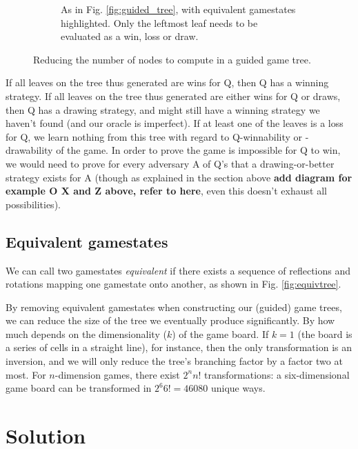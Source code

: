 \documentclass[12pt,a4paper]{article}
\begin{document}
\begin{figure}
\begin{subfigure}{.45\textwidth}
	\caption{As in Fig. \ref{fig:guided_tree}, with equivalent gamestates highlighted. Only the leftmost leaf needs to be evaluated as a win, loss or draw.} \label{fig:isotree}
\end{subfigure}
\caption{Reducing the number of nodes to compute in a guided game tree.}
\label{fig:guided_trees}
\end{figure}

If all leaves on the tree thus generated are wins for Q, then Q has a winning strategy. If all leaves on the tree thus generated are either wins for Q or draws, then Q has a drawing strategy, and might still have a winning strategy we haven't found (and our oracle is imperfect). If at least one of the leaves is a loss for Q, we learn nothing from this tree with regard to Q-winnability or -drawability of the game. 
In order to prove the game is impossible for Q to win, we would need to prove for every adversary A of Q's that a drawing-or-better strategy exists for A (though as explained in the section above \textbf{add diagram for example O X and Z above, refer to here}, even this doesn't exhaust all possibilities). 

\subsection*{Equivalent gamestates}

We can call two gamestates \textit{equivalent} if there exists a sequence of reflections and rotations mapping one gamestate onto another, as shown in Fig. \ref{fig:equivtree}. 


By removing equivalent gamestates when constructing our (guided) game trees, we can reduce the size of the tree we eventually produce significantly. By how much depends on the dimensionality ($k$) of the game board. If $k=1$ (the board is a series of cells in a straight line), for instance, then the only transformation is an inversion, and we will only reduce the tree's branching factor by a factor two at most. For $n$-dimension games, there exist $2^nn!$ transformations: a six-dimensional game board can be transformed in $2^6 6!=46080$ unique ways.

\section{Solution}
\end{document}
